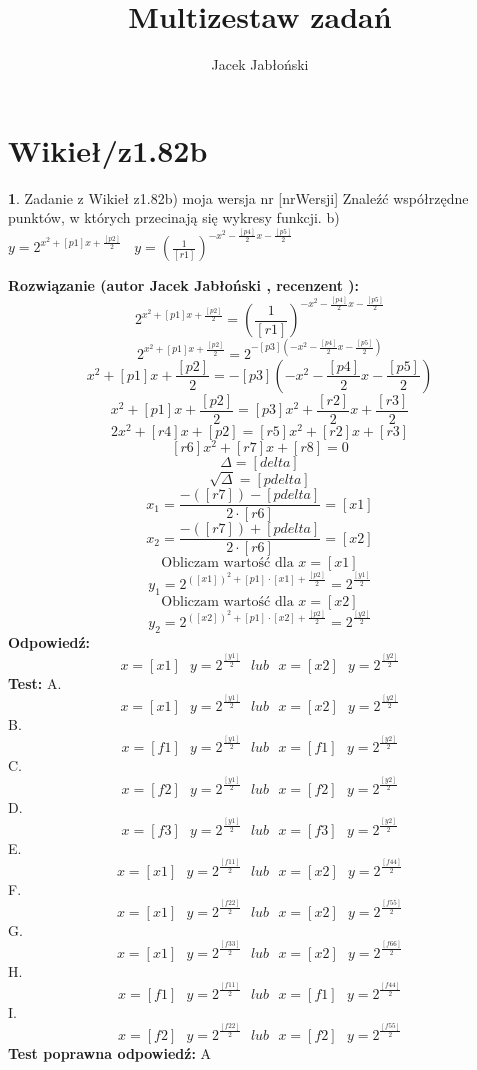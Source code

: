 \documentclass[12pt, a4paper]{article}
\title{Multizestaw zadań}
\author{Jacek Jabłoński}
\date{}
\theoremstyle{definition} %
\newtheorem{zad}{}
\newcommand{\kategoria}[1]{\section{#1}} %
\newcommand{\zadStart}[1]{\begin{zad}#1\newline} %
\newcommand{\zadStop}{\end{zad}}   %
\newcommand{\rozwStart}[2]{\noindent \textbf{Rozwiązanie (autor #1 , recenzent #2): }\newline} %
\newcommand{\rozwStop}{\newline}                                            %
\newcommand{\odpStart}{\noindent \textbf{Odpowiedź:}\newline}    %
\newcommand{\odpStop}{\newline}                                             %
\newcommand{\testStart}{\noindent \textbf{Test:}\newline} %
\newcommand{\testStop}{\newline} %
\newcommand{\kluczStart}{\noindent \textbf{Test poprawna odpowiedź:}\newline} %
\newcommand{\kluczStop}{\newline} %
\begin{document}
\maketitle


\kategoria{Wikieł/z1.82b}
\zadStart{Zadanie z Wikieł z1.82b) moja wersja nr [nrWersji]}
Znaleźć współrzędne punktów, w których przecinają się wykresy funkcji.
b) $y=2^{x^2+[p1]x+\frac{[p2]}{2}} \ \ \ \ y=(\frac{1}{[r1]})^{-x^2 - \frac{[p4]}{2}x - \frac{[p5]}{2}}$
\zadStop
\rozwStart{Jacek Jabłoński}{}
$$2^{x^2+[p1]x+\frac{[p2]}{2}} = (\frac{1}{[r1]})^{-x^2 - \frac{[p4]}{2}x - \frac{[p5]}{2}}$$
$$2^{x^2+[p1]x+\frac{[p2]}{2}} =2^{-[p3](-x^2 - \frac{[p4]}{2}x - \frac{[p5]}{2})}$$
$$x^2+[p1]x+\frac{[p2]}{2} = -[p3](-x^2 - \frac{[p4]}{2}x - \frac{[p5]}{2})$$
$$x^2+[p1]x+\frac{[p2]}{2} = [p3]x^2 + \frac{[r2]}{2}x + \frac{[r3]}{2} $$
$$2x^2 + [r4]x + [p2] = [r5]x^2 + [r2]x + [r3] $$
$$[r6]x^2 + [r7]x + [r8] = 0 $$
$$\Delta = [delta]$$
$$\sqrt{\Delta} = [pdelta]$$
$$x_1 = \frac{-([r7]) - [pdelta]}{2 \cdot [r6]} = [x1]$$
$$x_2 = \frac{-([r7]) + [pdelta]}{2 \cdot [r6]} = [x2]$$
$$\textrm{Obliczam wartość dla } x = [x1]$$
$$y_1=2^{([x1])^2 +[p1] \cdot [x1] + \frac{[p2]}{2}} = 2^{\frac{[y1]}{2}} $$
$$\textrm{Obliczam wartość dla } x = [x2]$$
$$y_2=2^{([x2])^2 +[p1] \cdot [x2] + \frac{[p2]}{2}} = 2^{\frac{[y2]}{2}} $$
\rozwStop
\odpStart
$$ x=[x1] \ \ \ y=2^{\frac{[y1]}{2}} \ \ \ lub \ \ \ x=[x2] \ \ \ y=2^{\frac{[y2]}{2}} $$
\odpStop
\testStart
A. $$ x=[x1] \ \ \ y=2^{\frac{[y1]}{2}} \ \ \ lub \ \ \ x=[x2] \ \ \ y=2^{\frac{[y2]}{2}} $$
B. $$ x=[f1] \ \ \ y=2^{\frac{[y1]}{2}} \ \ \ lub \ \ \ x=[f1] \ \ \ y=2^{\frac{[y2]}{2}} $$
C. $$ x=[f2] \ \ \ y=2^{\frac{[y1]}{2}} \ \ \ lub \ \ \ x=[f2] \ \ \ y=2^{\frac{[y2]}{2}} $$
D. $$ x=[f3] \ \ \ y=2^{\frac{[y1]}{2}} \ \ \ lub \ \ \ x=[f3] \ \ \ y=2^{\frac{[y2]}{2}} $$
E. $$ x=[x1] \ \ \ y=2^{\frac{[f11]}{2}} \ \ \ lub \ \ \ x=[x2] \ \ \ y=2^{\frac{[f44]}{2}} $$
F. $$ x=[x1] \ \ \ y=2^{\frac{[f22]}{2}} \ \ \ lub \ \ \ x=[x2] \ \ \ y=2^{\frac{[f55]}{2}} $$
G. $$ x=[x1] \ \ \ y=2^{\frac{[f33]}{2}} \ \ \ lub \ \ \ x=[x2] \ \ \ y=2^{\frac{[f66]}{2}} $$
H. $$ x=[f1] \ \ \ y=2^{\frac{[f11]}{2}} \ \ \ lub \ \ \ x=[f1] \ \ \ y=2^{\frac{[f44]}{2}} $$
I. $$ x=[f2] \ \ \ y=2^{\frac{[f22]}{2}} \ \ \ lub \ \ \ x=[f2] \ \ \ y=2^{\frac{[f55]}{2}} $$
\testStop
\kluczStart
A
\kluczStop
\end{document}
